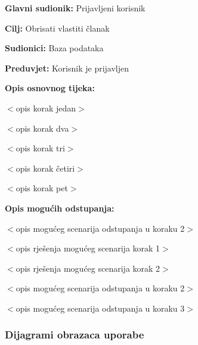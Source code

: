\noindent {}
\begin{packed_item}

\item \textbf{Glavni sudionik:} Prijavljeni korisnik
\item  \textbf{Cilj:} Obrisati vlastiti članak
\item  \textbf{Sudionici:} Baza podataka
\item  \textbf{Preduvjet:} Korisnik je prijavljen
\item  \textbf{Opis osnovnog tijeka:}

\item[] \begin{packed_enum}

    \item $<$opis korak jedan$>$
    \item $<$opis korak dva$>$
    \item $<$opis korak tri$>$
    \item $<$opis korak četiri$>$
    \item $<$opis korak pet$>$

\end{packed_enum}

\item  \textbf{Opis mogućih odstupanja:}

\item[] \begin{packed_item}

    \item[2.a] $<$opis mogućeg scenarija odstupanja u koraku 2$>$
    \item[] \begin{packed_enum}

        \item $<$opis rješenja mogućeg scenarija korak 1$>$
        \item $<$opis rješenja mogućeg scenarija korak 2$>$

    \end{packed_enum}

\item[2.b] $<$opis mogućeg scenarija odstupanja u koraku 2$>$
\item[3.a] $<$opis mogućeg scenarija odstupanja  u koraku 3$>$

\end{packed_item}
\end{packed_item}

\subsubsection{Dijagrami obrazaca uporabe}

